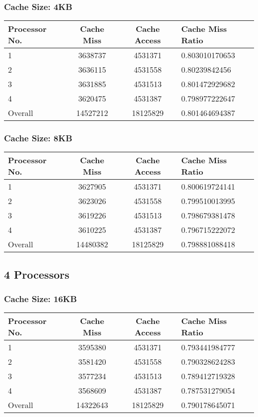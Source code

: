 \documentclass[]{article}
\begin{document}
\subsubsection{Cache Size: 4KB}
\begin{tabularx}{\textwidth}{ | l | c | c | X | }
\hline
Processor No.    & Cache Miss    & Cache Access  &   Cache Miss Ratio \\
\hline
1    & 3638737  & 4531371    & 0.803010170653 \\
\hline
2    & 3636115  & 4531558    & 0.80239842456 \\
\hline
3    & 3631885  & 4531513    & 0.801472929682 \\
\hline
4    & 3620475  & 4531387    & 0.798977222647 \\
\hline
Overall & 14527212    & 18125829  & 0.801464694387 \\
\hline
\end{tabularx}


\subsubsection{Cache Size: 8KB}
\begin{tabularx}{\textwidth}{ | l | c | c | X | }
\hline
Processor No.    & Cache Miss    & Cache Access  &   Cache Miss Ratio \\
\hline
1    & 3627905  & 4531371    & 0.800619724141 \\
\hline
2    & 3623026  & 4531558    & 0.799510013995 \\
\hline
3    & 3619226  & 4531513    & 0.798679381478 \\
\hline
4    & 3610225  & 4531387    & 0.796715222072 \\
\hline
Overall & 14480382    & 18125829  & 0.798881088418 \\
\hline
\end{tabularx}\subsection{4 Processors}


\subsubsection{Cache Size: 16KB}
\begin{tabularx}{\textwidth}{ | l | c | c | X | }
\hline
Processor No.    & Cache Miss    & Cache Access  &   Cache Miss Ratio \\
\hline
1    & 3595380  & 4531371    & 0.793441984777 \\
\hline
2    & 3581420  & 4531558    & 0.790328624283 \\
\hline
3    & 3577234  & 4531513    & 0.789412719328 \\
\hline
4    & 3568609  & 4531387    & 0.787531279054 \\
\hline
Overall & 14322643    & 18125829  & 0.790178645071 \\
\hline
\end{tabularx}
\end{document}
